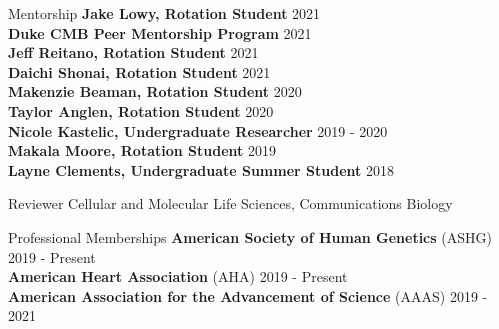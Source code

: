 \documentclass{resume} %
\begin{document}
\begin{rSection}{Mentorship}
{\bf Jake Lowy, Rotation Student} \hfill {2021}\\
{\bf Duke CMB Peer Mentorship Program} \hfill {2021}\\
{\bf Jeff Reitano, Rotation Student} \hfill {2021}\\
{\bf Daichi Shonai, Rotation Student} \hfill {2021}\\
{\bf Makenzie Beaman, Rotation Student} \hfill {2020}\\
{\bf Taylor Anglen, Rotation Student} \hfill {2020}\\
{\bf Nicole Kastelic, Undergraduate Researcher} \hfill {2019 - 2020}\\
{\bf Makala Moore, Rotation Student} \hfill {2019}\\
{\bf Layne Clements, Undergraduate Summer Student} \hfill {2018}\\

\end{rSection}


\begin{rSection}{Reviewer}
Cellular and Molecular Life Sciences, Communications Biology
\end{rSection}


\begin{rSection}{Professional Memberships}
{\bf American Society of Human Genetics} (ASHG)  \hfill {2019 - Present} \\ 
{\bf American Heart Association} (AHA) \hfill {2019 - Present} \\ 
{\bf American Association for the Advancement of Science} (AAAS) \hfill {2019 - 2021} \\
\end{rSection}
\end{document}
